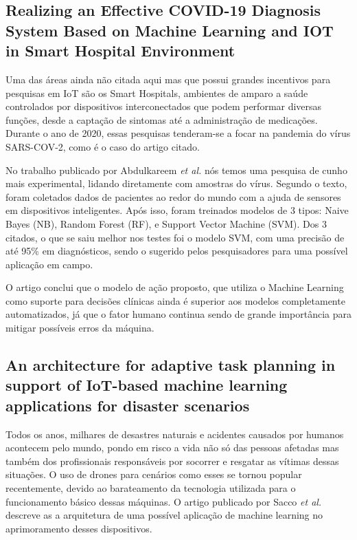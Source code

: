 \documentclass[12pt]{article}
\begin{document}
\subsection{Realizing an Effective COVID-19 Diagnosis System Based on Machine Learning and IOT in Smart Hospital Environment \cite{hameed}}

Uma das áreas ainda não citada aqui mas que possui grandes incentivos para pesquisas em IoT são os Smart Hospitals, ambientes de amparo a saúde controlados por dispositivos
interconectados que podem performar diversas funções, desde a captação de sintomas até a administração de medicações. Durante o ano de 2020, essas pesquisas tenderam-se a focar na pandemia
do vírus SARS-COV-2, como é o caso do artigo citado.

No trabalho publicado por Abdulkareem \emph{et al.} nós temos uma pesquisa de cunho mais experimental, lidando diretamente com amostras do vírus. Segundo o texto, foram coletados dados de pacientes
ao redor do mundo com a ajuda de sensores em dispositivos inteligentes. Após isso, foram treinados modelos de 3 tipos: Naive Bayes (NB), Random Forest (RF), e
Support Vector Machine (SVM). Dos 3 citados, o que se saiu melhor nos testes foi o modelo SVM, com uma precisão de até 95\% em diagnósticos, sendo o sugerido pelos pesquisadores para uma possível aplicação em campo.

O artigo conclui que o modelo de ação proposto, que utiliza o Machine Learning como suporte para decisões clínicas ainda é superior aos modelos completamente automatizados, já que o fator humano continua
sendo de grande importância para mitigar possíveis erros da máquina.

\subsection{An architecture for adaptive task planning in support of IoT-based machine learning applications for disaster scenarios \cite{sacco}}

Todos os anos, milhares de desastres naturais e acidentes causados por humanos acontecem pelo mundo, pondo em risco a vida não só das pessoas afetadas mas também dos
profissionais responsáveis por socorrer e resgatar as vítimas dessas situações. O uso de drones para cenários como esses se tornou popular recentemente, devido ao barateamento da tecnologia
utilizada para o funcionamento básico dessas máquinas. O artigo publicado por Sacco \emph{et al.} descreve as a arquitetura de uma possível aplicação de machine learning no aprimoramento desses dispositivos.
\end{document}
